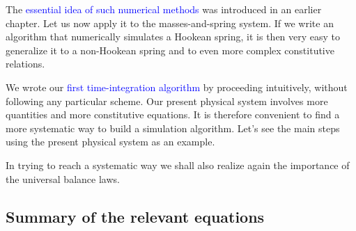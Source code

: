 \documentclass[a4paper,12pt,%
onecolumn,oneside,titlepage,%
british%
]{memoir}
\renewcommand*{\|}[1][]{\nonscript\:#1\vert\nonscript\:\mathopen{}}
\newcommand*{\sect}{\S}%
\renewcommand*{\autoref}[2]{\sidepar{\vspace{-1ex}\footnotesize{\color{blue}\faIcon{%
reply%
}\enspace\sect\,\ref{#1} page\,\pageref{#1}}}\textcolor{blue}{#2}}
\newcommand*{\masse}{mass-energy}
\begin{document}
The \autoref{sec:numeric_simulation}{essential idea of such numerical methods} was introduced in an earlier chapter. Let us now apply it to the masses-and-spring system. If we write an algorithm that numerically simulates a Hookean spring, it is then very easy to generalize it to a non-Hookean spring and to even more complex constitutive relations.


We wrote our \autoref{sec:applicable_numericintegration}{first time-integration algorithm} by proceeding intuitively, without following any particular scheme. Our present physical system involves more quantities and more constitutive equations. It is therefore convenient to find a more systematic way to build a simulation algorithm. Let's see the main steps using the present physical system as an example.

In trying to reach a systematic way we shall also realize again the importance of the universal balance laws.

\subsection{Summary of the relevant equations}
\label{sec:summary_equations_strategy_script}
\end{document}
